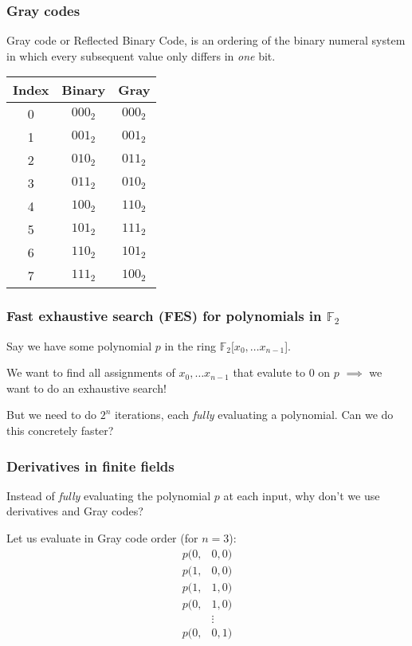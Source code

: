 \documentclass{beamer}
\begin{document}
\begin{frame}
    \frametitle{Gray codes}
    Gray code or Reflected Binary Code, is an ordering of the binary numeral system in which every subsequent value only differs in \textit{one} bit.

    \begin{center}
        \begin{tabular}{||c|c|c||}
            \hline
            Index & Binary & Gray \\
            \hline
            0 & $000_2$ & $000_2$\\
            1 & $001_2$ & $001_2$\\
            2 & $010_2$ & $011_2$\\
            3 & $011_2$ & $010_2$\\
            4 & $100_2$ & $110_2$\\
            5 & $101_2$ & $111_2$\\
            6 & $110_2$ & $101_2$\\
            7 & $111_2$ & $100_2$\\
            \hline
        \end{tabular}
    \end{center}
\end{frame}

\begin{frame}
    \frametitle{Fast exhaustive search (FES) for polynomials in $\mathbb{F}_2$}
    Say we have some polynomial $p$ in the ring $\mathbb{F}_2[x_0,\dots x_{n-1}$].
    
    \pause

    We want to find all assignments of $x_0, \dots x_{n - 1}$ that evalute to 0 on $p$ $\implies$ we want to do an exhaustive search!

    But we need to do $2^n$ iterations, each \textit{fully} evaluating a polynomial. Can we do this concretely faster?
\end{frame}

\begin{frame}
    \frametitle{Derivatives in finite fields}
    Instead of \textit{fully} evaluating the polynomial $p$ at each input, why don't we use derivatives and Gray codes? 
    
    \pause 

    Let us evaluate in Gray code order (for $n = 3$):
    \begin{equation*}
        \begin{split}
            p(0,&0,0)\\
            p(1,&0,0)\\
            p(1,&1,0)\\
            p(0,&1,0)\\
            &\vdots\\
            p(0,&0,1)
        \end{split}
    \end{equation*}
\end{frame}
\end{document}
